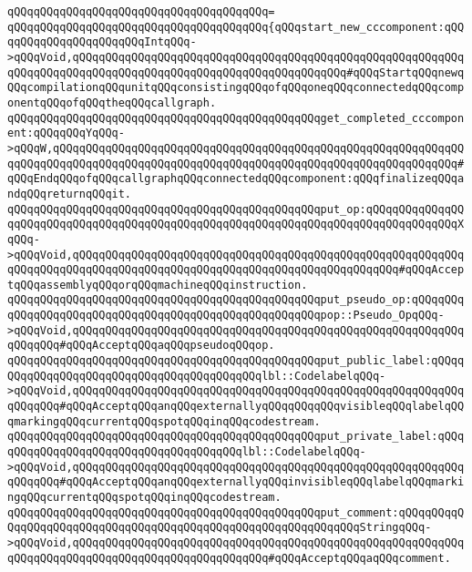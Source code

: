 \verb|qQQqqQQqqQQqqQQqqQQqqQQqqQQqqQQqqQQqqQQq=|\newline
\verb|qQQqqQQqqQQqqQQqqQQqqQQqqQQqqQQqqQQqqQQq{qQQqstart_new_cccomponent:qQQqqQQqqQQqqQQqqQQqqQQqIntqQQq->qQQqVoid,qQQqqQQqqQQqqQQqqQQqqQQqqQQqqQQqqQQqqQQqqQQqqQQqqQQqqQQqqQQqqQQqqQQqqQQqqQQqqQQqqQQqqQQqqQQqqQQqqQQqqQQqqQQqqQQq#qQQqStartqQQqnewqQQqcompilationqQQqunitqQQqconsistingqQQqofqQQqoneqQQqconnectedqQQqcomponentqQQqofqQQqtheqQQqcallgraph.|\newline
\verb|qQQqqQQqqQQqqQQqqQQqqQQqqQQqqQQqqQQqqQQqqQQqqQQqget_completed_cccomponent:qQQqqQQqYqQQq->qQQqW,qQQqqQQqqQQqqQQqqQQqqQQqqQQqqQQqqQQqqQQqqQQqqQQqqQQqqQQqqQQqqQQqqQQqqQQqqQQqqQQqqQQqqQQqqQQqqQQqqQQqqQQqqQQqqQQqqQQqqQQqqQQqqQQqqQQq#qQQqEndqQQqofqQQqcallgraphqQQqconnectedqQQqcomponent:qQQqfinalizeqQQqandqQQqreturnqQQqit.|\newline
\verb|qQQqqQQqqQQqqQQqqQQqqQQqqQQqqQQqqQQqqQQqqQQqqQQqput_op:qQQqqQQqqQQqqQQqqQQqqQQqqQQqqQQqqQQqqQQqqQQqqQQqqQQqqQQqqQQqqQQqqQQqqQQqqQQqqQQqqQQqXqQQq->qQQqVoid,qQQqqQQqqQQqqQQqqQQqqQQqqQQqqQQqqQQqqQQqqQQqqQQqqQQqqQQqqQQqqQQqqQQqqQQqqQQqqQQqqQQqqQQqqQQqqQQqqQQqqQQqqQQqqQQqqQQqqQQq#qQQqAcceptqQQqassemblyqQQqorqQQqmachineqQQqinstruction.|\newline
\verb|qQQqqQQqqQQqqQQqqQQqqQQqqQQqqQQqqQQqqQQqqQQqqQQqput_pseudo_op:qQQqqQQqqQQqqQQqqQQqqQQqqQQqqQQqqQQqqQQqqQQqqQQqqQQqqQQqpop::Pseudo_OpqQQq->qQQqVoid,qQQqqQQqqQQqqQQqqQQqqQQqqQQqqQQqqQQqqQQqqQQqqQQqqQQqqQQqqQQqqQQqqQQq#qQQqAcceptqQQqaqQQqpseudoqQQqop.|\newline
\verb|qQQqqQQqqQQqqQQqqQQqqQQqqQQqqQQqqQQqqQQqqQQqqQQqput_public_label:qQQqqQQqqQQqqQQqqQQqqQQqqQQqqQQqqQQqqQQqqQQqlbl::CodelabelqQQq->qQQqVoid,qQQqqQQqqQQqqQQqqQQqqQQqqQQqqQQqqQQqqQQqqQQqqQQqqQQqqQQqqQQqqQQqqQQq#qQQqAcceptqQQqanqQQqexternallyqQQqqQQqqQQqvisibleqQQqlabelqQQqmarkingqQQqcurrentqQQqspotqQQqinqQQqcodestream.|\newline
\verb|qQQqqQQqqQQqqQQqqQQqqQQqqQQqqQQqqQQqqQQqqQQqqQQqput_private_label:qQQqqQQqqQQqqQQqqQQqqQQqqQQqqQQqqQQqqQQqlbl::CodelabelqQQq->qQQqVoid,qQQqqQQqqQQqqQQqqQQqqQQqqQQqqQQqqQQqqQQqqQQqqQQqqQQqqQQqqQQqqQQqqQQq#qQQqAcceptqQQqanqQQqexternallyqQQqinvisibleqQQqlabelqQQqmarkingqQQqcurrentqQQqspotqQQqinqQQqcodestream.|\newline
\verb|qQQqqQQqqQQqqQQqqQQqqQQqqQQqqQQqqQQqqQQqqQQqqQQqput_comment:qQQqqQQqqQQqqQQqqQQqqQQqqQQqqQQqqQQqqQQqqQQqqQQqqQQqqQQqqQQqqQQqStringqQQq->qQQqVoid,qQQqqQQqqQQqqQQqqQQqqQQqqQQqqQQqqQQqqQQqqQQqqQQqqQQqqQQqqQQqqQQqqQQqqQQqqQQqqQQqqQQqqQQqqQQqqQQqqQQq#qQQqAcceptqQQqaqQQqcomment.|\newline

